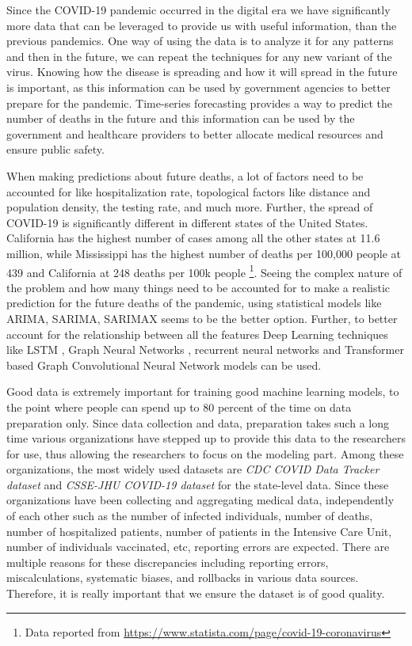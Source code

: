 \documentclass[11pt,twocolumn,letterpaper]{article}
\begin{document}
Since the COVID-19 pandemic occurred in the digital era we have significantly more data that can be leveraged to provide us with useful information, than the previous pandemics. One way of using the data is to analyze it for any patterns and then in the future, we can repeat the techniques for any new variant of the virus. Knowing how the disease is spreading and how it will spread in the future is important, as this information can be used by government agencies to better prepare for the pandemic. Time-series forecasting provides a way to predict the number of deaths in the future and this information can be used by the government and healthcare providers to better allocate medical resources and ensure public safety.

When making predictions about future deaths, a lot of factors need to be accounted for like hospitalization rate, topological factors like distance and population density, the testing rate, and much more. Further, the spread of COVID-19 is significantly different in different states of the United States. California has the highest number of cases among all the other states at 11.6 million, while Mississippi has the highest number of deaths per 100,000 people at 439 and California at 248 deaths per 100k people \footnote{Data reported from \href{https://www.statista.com/page/covid-19-coronavirus}{https://www.statista.com/page/covid-19-coronavirus}}. Seeing the complex nature of the problem and how many things need to be accounted for to make a realistic prediction for the future deaths of the pandemic, using statistical models like ARIMA, SARIMA, SARIMAX \cite{ref3} seems to be the better option. Further, to better account for the relationship between all the features Deep Learning techniques like LSTM \cite{ref2}, Graph Neural Networks \cite{ref4}, recurrent neural networks \cite{ref5} and Transformer based Graph Convolutional Neural Network models \cite{ref6} can be used.

Good data is extremely important for training good machine learning models, to the point where people can spend up to 80 percent of the time on data preparation only. Since data collection and data, preparation takes such a long time various organizations have stepped up to provide this data to the researchers for use, thus allowing the researchers to focus on the modeling part. Among these organizations, the most widely used datasets are \emph{CDC COVID Data Tracker dataset} and \emph{CSSE-JHU COVID-19 dataset} for the state-level data. Since these organizations have been collecting and aggregating medical data, independently of each other such as the number of infected individuals, number of deaths, number of hospitalized patients, number of patients in the Intensive Care Unit, number of individuals vaccinated, etc, reporting errors are expected. There are multiple reasons for these discrepancies including reporting errors, miscalculations, systematic biases, and rollbacks in various data sources. Therefore, it is really important that we ensure the dataset is of good quality.
\end{document}
